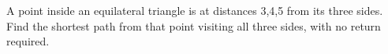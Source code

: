 A point inside an equilateral triangle is at distances 3,4,5 from its three sides. Find the shortest path from that point visiting all three sides, with no return required.
